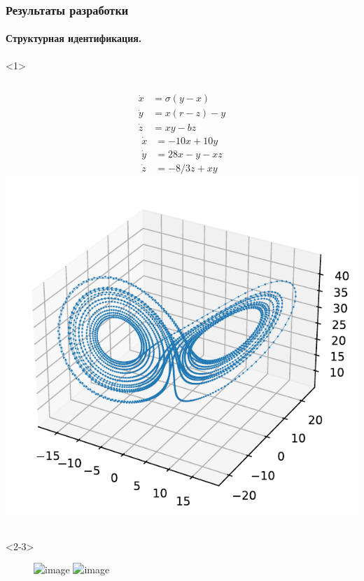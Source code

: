 \documentclass[pdf, hyperref={unicode}, aspectratio=169]{beamer}
\begin{document}
\begin{frame}
\frametitle{Результаты разработки}
\framesubtitle{Структурная идентификация.
}

\begin{onlyenv}<1>
\large
\begin{columns}
  \begin{align*}
  \dot{x} &= \sigma (y - x) \\
  \dot{y} &= x (r - z) - y \\
  \dot{z} &= x y - b z
  \end{align*}
  \begin{align*}
  \dot{x} &= -10 x + 10 y \\
  \dot{y} &= 28 x - y - x z \\
  \dot{z} &= - 8/3 z + x y
  \end{align*}
  \includegraphics[width=0.93\linewidth]{img/lorenz_big}
\end{columns}
\vfill
\end{onlyenv}

\begin{onlyenv}<2-3>
\begin{figure}
\includegraphics<2>[height=0.8\textheight]{img/lorenz_test}
\includegraphics<3>[height=0.8\textheight]{img/lorenz_scores}
\end{figure}
\end{onlyenv}


\end{frame}
\end{document}
